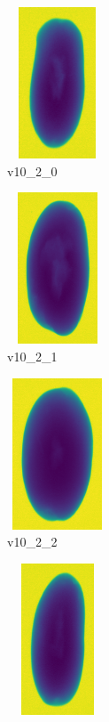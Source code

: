 \documentclass[11pt]{article}
\begin{document}
\begin{figure}
     \centering
          
    \begin{subfigure}[b]{0.15\textwidth}
         \centering
         \includegraphics[width=3cm, height=4.5cm]{images/kartofler/v10_1_20_cut.png}
         \caption{v10\_2\_0}
         \label{fig:y equals x}
     \end{subfigure}
     \hfill
     \begin{subfigure}[b]{0.15\textwidth}
         \centering
         \includegraphics[width=3cm, height=4.5cm]{images/kartofler/v10_1_21_cut.png}
        \caption{v10\_2\_1}
         \label{fig:three sin x}
     \end{subfigure}
     \hfill
     \begin{subfigure}[b]{0.15\textwidth}
         \centering
         \includegraphics[width=3cm, height=4.5cm]{images/kartofler/v10_1_22_cut.png}
        \caption{v10\_2\_2}
         \label{fig:five over x}
     \end{subfigure}
     \hfill
    \begin{subfigure}[b]{0.15\textwidth}
         \centering
         \includegraphics[width=3cm, height=4.5cm]{images/kartofler/v10_1_23_cut.png}

\end{subfigure}
\end{figure}
\end{document}
